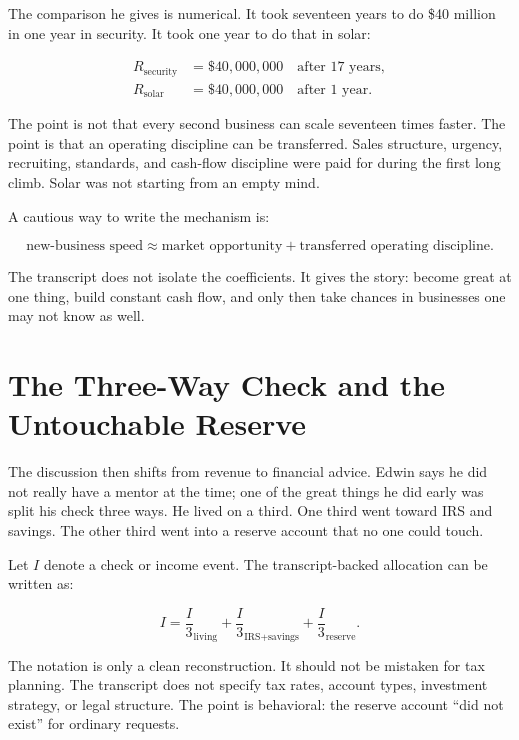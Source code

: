 The comparison he gives is numerical. It took seventeen years to do \$40 million in one year in security. It took one year to do that in solar:

\begin{align}
R_{\text{security}} &= \$40{,}000{,}000
\quad \text{after }17\text{ years},\\
R_{\text{solar}} &= \$40{,}000{,}000
\quad \text{after }1\text{ year}.
\end{align}

The point is not that every second business can scale seventeen times faster. The point is that an operating discipline can be transferred. Sales structure, urgency, recruiting, standards, and cash-flow discipline were paid for during the first long climb. Solar was not starting from an empty mind.

A cautious way to write the mechanism is:

\begin{equation}
\text{new-business speed}
\approx
\text{market opportunity}
+
\text{transferred operating discipline}.
\end{equation}

The transcript does not isolate the coefficients. It gives the story: become great at one thing, build constant cash flow, and only then take chances in businesses one may not know as well.

\section{The Three-Way Check and the Untouchable Reserve}

The discussion then shifts from revenue to financial advice. Edwin says he did not really have a mentor at the time; one of the great things he did early was split his check three ways. He lived on a third. One third went toward IRS and savings. The other third went into a reserve account that no one could touch.

Let \(I\) denote a check or income event. The transcript-backed allocation can be written as:

\begin{equation}
I
=
\frac{I}{3}_{\text{living}}
+
\frac{I}{3}_{\text{IRS+savings}}
+
\frac{I}{3}_{\text{reserve}}.
\end{equation}

The notation is only a clean reconstruction. It should not be mistaken for tax planning. The transcript does not specify tax rates, account types, investment strategy, or legal structure. The point is behavioral: the reserve account ``did not exist'' for ordinary requests.


